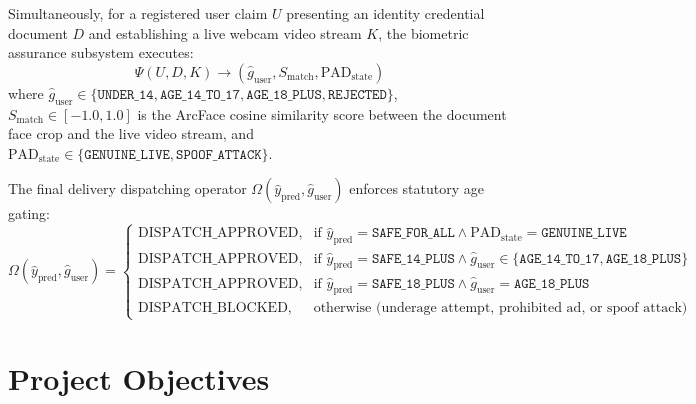 \documentclass[12pt,a4paper]{report}
\begin{document}
Simultaneously, for a registered user claim $U$ presenting an identity credential document $D$ and establishing a live webcam video stream $K$, the biometric assurance subsystem executes:
\begin{equation}
\Psi(U, D, K) \longrightarrow \left( \hat{g}_{\text{user}}, S_{\text{match}}, \text{PAD}_{\text{state}} \right)
\end{equation}
where $\hat{g}_{\text{user}} \in \{\texttt{UNDER\_14}, \texttt{AGE\_14\_TO\_17}, \texttt{AGE\_18\_PLUS}, \texttt{REJECTED}\}$, $S_{\text{match}} \in [-1.0, 1.0]$ is the ArcFace cosine similarity score between the document face crop and the live video stream, and $\text{PAD}_{\text{state}} \in \{\texttt{GENUINE\_LIVE}, \texttt{SPOOF\_ATTACK}\}$.

The final delivery dispatching operator $\Omega(\hat{y}_{\text{pred}}, \hat{g}_{\text{user}})$ enforces statutory age gating:
\begin{equation}
\Omega(\hat{y}_{\text{pred}}, \hat{g}_{\text{user}}) = 
\begin{cases}
\text{DISPATCH\_APPROVED}, & \text{if } \hat{y}_{\text{pred}} = \texttt{SAFE\_FOR\_ALL} \land \text{PAD}_{\text{state}} = \texttt{GENUINE\_LIVE} \\
\text{DISPATCH\_APPROVED}, & \text{if } \hat{y}_{\text{pred}} = \texttt{SAFE\_14\_PLUS} \land \hat{g}_{\text{user}} \in \{\texttt{AGE\_14\_TO\_17}, \texttt{AGE\_18\_PLUS}\} \\
\text{DISPATCH\_APPROVED}, & \text{if } \hat{y}_{\text{pred}} = \texttt{SAFE\_18\_PLUS} \land \hat{g}_{\text{user}} = \texttt{AGE\_18\_PLUS} \\
\text{DISPATCH\_BLOCKED}, & \text{otherwise (underage attempt, prohibited ad, or spoof attack)}
\end{cases}
\end{equation}

\section{Project Objectives}
\end{document}
